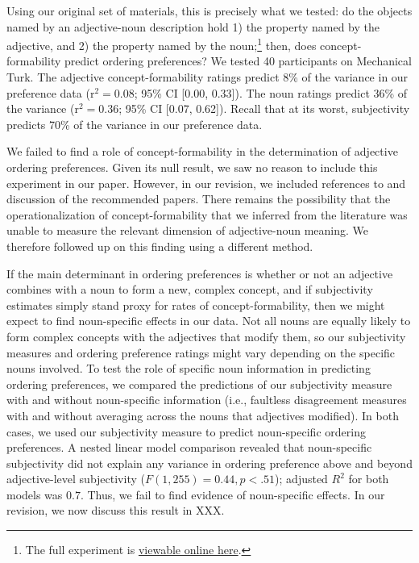 \documentclass[12pt]{article}
\begin{document}
Using our original set of materials, this is precisely what we tested: do the objects named by an adjective-noun description hold 1) the property named by the adjective, and 2) the property named by the noun;\footnote{The full experiment is \href{http://web.stanford.edu/~scontras/adjective_ordering/experiments/9-concept-formability/concept-formability.html}{viewable online here}.} then, does concept-formability predict ordering preferences? We tested 40 participants on Mechanical Turk. The adjective concept-formability ratings predict 8\% of the variance in our preference data (r$^{2}=0.08$; 95\% CI [0.00,  0.33]). The noun ratings predict 36\% of the variance (r$^{2}=0.36$; 95\% CI [0.07,  0.62]). Recall that at its worst, subjectivity predicts 70\% of the variance in our preference data.

We failed to find a role of concept-formability in the determination of adjective ordering preferences. Given its null result, we saw no reason to include this experiment in our paper. However, in our revision, we included references to and discussion of the recommended papers. 
There remains the possibility that the operationalization of concept-formability that we inferred from the literature was unable to measure the relevant dimension of adjective-noun meaning. We therefore followed up on this finding using a different method. 

If the main determinant in ordering preferences is whether or not an adjective combines with a noun to form a new, complex concept, and if subjectivity estimates simply stand proxy for rates of concept-formability, then we might expect to find noun-specific effects in our data. Not all nouns are equally likely to form complex concepts with the adjectives that modify them, so our subjectivity measures and ordering preference ratings might vary depending on the specific nouns involved. To test the role of specific noun information in predicting ordering preferences, we compared the predictions of our subjectivity measure with and without noun-specific information (i.e., faultless disagreement measures with and without averaging across the nouns that adjectives modified). In both cases, we used our subjectivity measure to predict noun-specific ordering preferences. A nested linear model comparison revealed that noun-specific subjectivity did not explain any variance in ordering preference above and beyond adjective-level subjectivity ($F(1,255) = 0.44, p < .51$); adjusted $R^2$ for both models was $0.7$. Thus, we fail to find evidence of noun-specific effects. In our revision, we now discuss this result in XXX.
\end{document}
